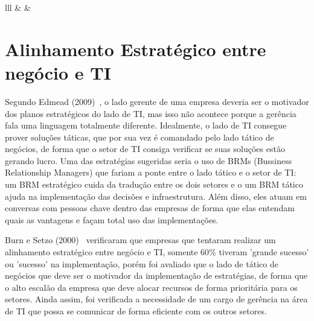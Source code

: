 \documentclass[review]{elsarticle}
\begin{document}
\begin{table}[]
\begin{tabular}{lll}
		 &  &                                \\ \hline
	\end{tabular}
	\caption{Definições de Estratégia, segundo os 5 Ps da Estratégia. \cite{Sobrosa2009}}
	
	\label{tabela_strat}
\end{table}

\section{Alinhamento Estratégico entre negócio e TI}

Segundo Edmead (2009)~\cite{Edmead2016}, o lado gerente de uma empresa deveria ser o motivador dos planos estratégicos do lado de TI, mas isso não acontece porque a gerência fala uma linguagem totalmente diferente. Idealmente, o lado de TI consegue prover soluções táticas, que por sua vez é comandado pelo lado tático de negócios, de forma que o setor de TI consiga verificar se suas soluções estão gerando lucro. Uma das estratégias sugeridas seria o uso de BRMs (Bussiness Relationship Managers) que fariam a ponte entre o lado tático e o setor de TI: um BRM estratégico cuida da tradução entre os dois setores e o um BRM tático ajuda na implementação das decisões e infraestrutura. Além disso, eles atuam em conversas com pessoas chave dentro das empresas de forma que elas entendam quais as vantagens e façam total uso das implementações.

Burn e Setzo (2000)~\cite{BURN2000197} verificaram que empresas que tentaram realizar um alinhamento estratégico entre negócio e TI, somente 60{\%} tiveram 'grande sucesso' ou 'sucesso' na implementação, porém foi avaliado que o lado de tático de negócios que deve ser o motivador da implementação de estratégias, de forma que o alto escalão da empresa que deve alocar recursos de forma prioritária para os setores. Ainda assim, foi verificada a necessidade de um cargo de gerência na área de TI que possa se comunicar de forma eficiente com os outros setores. 
\end{document}
